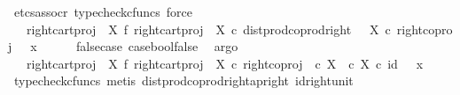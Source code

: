 \begin{isabellebody}
\ {\isacharparenleft}{\kern0pt}etcs{\isacharunderscore}{\kern0pt}assocr{\isacharcomma}{\kern0pt}\ typecheck{\isacharunderscore}{\kern0pt}cfuncs{\isacharcomma}{\kern0pt}\ force{\isacharparenright}{\kern0pt}\isanewline
\ \ \isamarkupfalse%
\ \isamarkupfalse%
\ {\isachardoublequoteopen}{\isachardot}{\kern0pt}{\isachardot}{\kern0pt}{\isachardot}{\kern0pt}\ {\isacharequal}{\kern0pt}\ {\isacharparenleft}{\kern0pt}right{\isacharunderscore}{\kern0pt}cart{\isacharunderscore}{\kern0pt}proj\ {\isasymone}\ X\ {\isasymbowtie}\isactrlsub f\ right{\isacharunderscore}{\kern0pt}cart{\isacharunderscore}{\kern0pt}proj\ {\isasymone}\ X{\isacharparenright}{\kern0pt}\ {\isasymcirc}\isactrlsub c\ dist{\isacharunderscore}{\kern0pt}prod{\isacharunderscore}{\kern0pt}coprod{\isacharunderscore}{\kern0pt}right\ {\isasymone}\ {\isasymone}\ X\ {\isasymcirc}\isactrlsub c\ {\isasymlangle}right{\isacharunderscore}{\kern0pt}coproj\ {\isasymone}\ {\isasymone}{\isacharcomma}{\kern0pt}\ x{\isasymrangle}{\isachardoublequoteclose}\isanewline
\ \ \ \ \isamarkupfalse%
\ false{\isacharunderscore}{\kern0pt}case\ case{\isacharunderscore}{\kern0pt}bool{\isacharunderscore}{\kern0pt}false\ \isamarkupfalse%
\ argo\isanewline
\ \ \isamarkupfalse%
\ \isamarkupfalse%
\ {\isachardoublequoteopen}{\isachardot}{\kern0pt}{\isachardot}{\kern0pt}{\isachardot}{\kern0pt}\ {\isacharequal}{\kern0pt}\ {\isacharparenleft}{\kern0pt}right{\isacharunderscore}{\kern0pt}cart{\isacharunderscore}{\kern0pt}proj\ {\isasymone}\ X\ {\isasymbowtie}\isactrlsub f\ right{\isacharunderscore}{\kern0pt}cart{\isacharunderscore}{\kern0pt}proj\ {\isasymone}\ X{\isacharparenright}{\kern0pt}\ {\isasymcirc}\isactrlsub c\ right{\isacharunderscore}{\kern0pt}coproj\ {\isacharparenleft}{\kern0pt}{\isasymone}\ {\isasymtimes}\isactrlsub c\ X{\isacharparenright}{\kern0pt}\ {\isacharparenleft}{\kern0pt}{\isasymone}\ {\isasymtimes}\isactrlsub c\ X{\isacharparenright}{\kern0pt}\ {\isasymcirc}\isactrlsub c\ {\isasymlangle}id\ {\isasymone}\ {\isacharcomma}{\kern0pt}\ x{\isasymrangle}{\isachardoublequoteclose}\isanewline
\ \ \ \ \isamarkupfalse%
\ {\isacharparenleft}{\kern0pt}typecheck{\isacharunderscore}{\kern0pt}cfuncs{\isacharcomma}{\kern0pt}\ metis\ dist{\isacharunderscore}{\kern0pt}prod{\isacharunderscore}{\kern0pt}coprod{\isacharunderscore}{\kern0pt}right{\isacharunderscore}{\kern0pt}ap{\isacharunderscore}{\kern0pt}right\ id{\isacharunderscore}{\kern0pt}right{\isacharunderscore}{\kern0pt}unit{}{\isacharparenright}{\kern0pt}\isanewline

\end{isabellebody}
